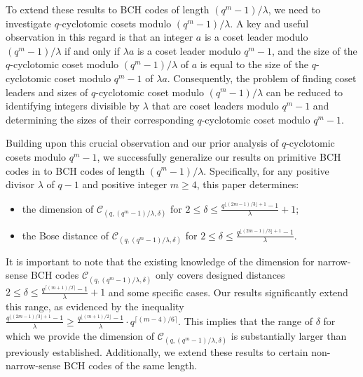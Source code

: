 \documentclass[journal,onecolumn]{IEEEtran}
\begin{document}
To extend these results to BCH codes of length $(q^m-1)/\lambda$, we need to investigate $q$-cyclotomic cosets modulo $(q^m-1)/\lambda$. A key and useful observation in this regard is that an integer $a $ is a coset leader modulo $(q^m-1)/\lambda$ if and only if $\lambda a$ is a coset leader modulo $q^m - 1$, and the size of the $q$-cyclotomic coset modulo $(q^m-1)/\lambda$ of $a$ is equal to the size of the $q$-cyclotomic coset modulo $q^m-1$ of  $\lambda a$. Consequently, the problem of finding coset leaders and sizes of   $q$-cyclotomic coset  modulo $(q^m-1)/\lambda$ can be reduced  to identifying integers divisible by $\lambda$ that are coset leaders modulo $q^m - 1$ and determining  the sizes of their corresponding  $q$-cyclotomic coset  modulo $q^m - 1$.

Building upon this crucial observation and our prior analysis of 
 $q$-cyclotomic cosets modulo $q^m-1$, we successfully generalize our  results on primitive BCH codes in \cite{zheng2025} to BCH codes of length $(q^m-1)/\lambda$. Specifically, for any positive divisor $\lambda$ of $q-1$ and positive integer $m\geq 4$, this paper  determines: 
\begin{itemize}
    \item the dimension of $\mathcal{C}_{(q,(q^m-1)/\lambda,\delta)}$ for $2\leq \delta \leq \frac{q^{\lfloor (2m-1)/3\rfloor+1}-1}{\lambda} +1 $;
\item the Bose distance of $\mathcal{C}_{(q,(q^m-1)/\lambda,\delta)}$ for $2\leq \delta \leq \frac{q^{\lfloor (2m-1)/3\rfloor+1}-1}{\lambda}$.   
\end{itemize}
It is important to note that the existing knowledge of the dimension for narrow-sense BCH codes 
 $\mathcal{C}_{(q,(q^m-1)/\lambda,\delta)}$ only covers designed distances  $2\leq \delta\leq    \frac{q^{\lceil (m+1)/2 \rceil}-1}{\lambda} + 1$ and some   specific cases.
Our results significantly extend this range, as evidenced by the inequality $\frac{q^{\lfloor (2m-1)/3\rfloor+1}-1}{\lambda}\geq \frac{q^{\lfloor (m+1)/2 \rfloor }-1}{\lambda}\cdot q^{\lceil (m-4)/6\rceil}$. This implies that the range of 
$\delta$ for which we provide the dimension of 
$\mathcal{C}_{(q,(q^m-1)/\lambda,\delta)}$
is substantially larger than previously established.
  Additionally, we extend these results to certain non-narrow-sense BCH codes of the same length.
\end{document}
